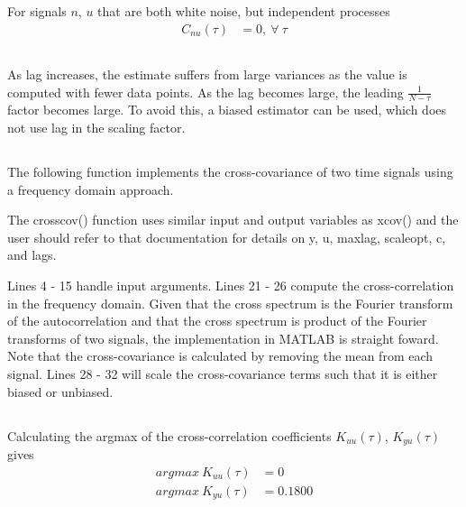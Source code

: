 \documentclass[times,12pt,reqno]{amsart}
\begin{document}
For signals $n$, $u$ that are both white noise, but independent processes
\begin{align*}
    C_{nu}(\tau) &= 0, \: \forall \: \tau
\end{align*}

\subsection{}
As lag increases, the estimate suffers from large variances as the value
is computed with fewer data points. As the lag becomes large, the leading
$\frac{1}{N - \tau}$ factor becomes large. To avoid this, a biased estimator
can be used, which does not use lag in the scaling factor.

\newpage
\subsection{}

The following function implements the cross-covariance of two time signals
using a frequency domain approach.

\lstset{caption=Cross-Covariance Function}


The crosscov() function uses similar input and output variables as xcov() and
the user should refer to that documentation for details on y, u, maxlag,
scaleopt, c, and lags.

Lines 4 - 15 handle input arguments. Lines 21 - 26 compute the
cross-correlation in the frequency domain. Given that the cross spectrum is the
Fourier transform of the autocorrelation and that the cross spectrum is product
of the Fourier transforms of two signals, the implementation in MATLAB is
straight foward. Note that the cross-covariance is calculated by removing the
mean from each signal. Lines 28 - 32 will scale the cross-covariance terms such
that it is either biased or unbiased.

\subsection{}
Calculating the argmax of the cross-correlation coefficients $K_{uu}(\tau)$,
$K_{yu}(\tau)$ gives
\begin{align*}
    argmax \: K_{uu}(\tau) &= 0 \\
    argmax \: K_{yu}(\tau) &= 0.1800
\end{align*}

\end{document}
